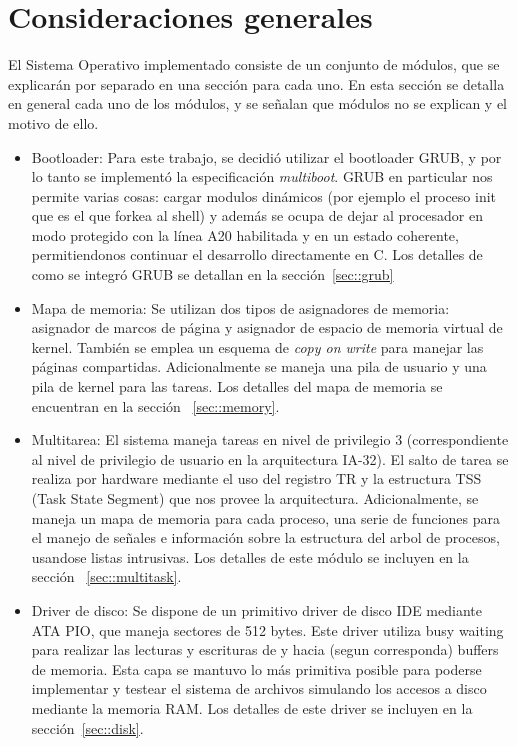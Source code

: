 \section{Consideraciones generales}

El Sistema Operativo implementado consiste de un conjunto de m\'odulos,
que se explicar\'an por separado en una secci\'on para cada uno.
En esta secci\'on se detalla en general cada uno de los m\'odulos, y se se\~nalan
que m\'odulos no se explican y el motivo de ello.

\begin{itemize}
	\item Bootloader: Para este trabajo, se decidi\'o utilizar el bootloader
	GRUB, y por lo tanto se implement\'o la especificaci\'on \textit{multiboot}.
	GRUB en particular nos permite varias cosas: cargar modulos din\'amicos (por
	ejemplo el proceso init que es el que forkea al shell) y adem\'as se ocupa de
	dejar al procesador en modo protegido con la l\'inea A20 habilitada y en un
	estado coherente, permitiendonos continuar el desarrollo directamente en C.
	Los detalles de como se integr\'o GRUB se detallan en la secci\'on~\ref{sec::grub}

	\item Mapa de memoria: Se utilizan dos tipos de asignadores de memoria:
	asignador de marcos de p\'agina y asignador de espacio de memoria virtual de
	kernel. Tambi\'en se emplea un esquema de \textit{copy on write} para manejar
	las p\'aginas compartidas. Adicionalmente se maneja una pila de usuario y una pila
	de kernel para las tareas. Los detalles del mapa de memoria se encuentran en la
	secci\'on ~\ref{sec::memory}.

	\item Multitarea: El sistema maneja tareas en nivel de privilegio 3 (correspondiente
	al nivel de privilegio de usuario en la arquitectura IA-32). El salto de tarea se realiza
	por hardware mediante el uso del registro TR y la estructura TSS (Task State Segment) que
	nos provee la arquitectura. Adicionalmente, se maneja un mapa de memoria para cada proceso,
	una serie de funciones para el manejo de señales e informaci\'on sobre la estructura del arbol
	de procesos, usandose listas intrusivas. Los detalles de este m\'odulo se incluyen en la secci\'on
	~\ref{sec::multitask}.

	\item Driver de disco: Se dispone de un primitivo driver de disco IDE mediante ATA PIO, que maneja
	sectores de 512 bytes. Este driver utiliza busy waiting para realizar las lecturas y escrituras de
	y hacia (segun corresponda) buffers de memoria. Esta capa se mantuvo lo m\'as primitiva posible para
	poderse implementar y testear el sistema de archivos simulando los accesos a disco mediante la memoria
	RAM. Los detalles de este driver se incluyen en la secci\'on~\ref{sec::disk}.


\end{itemize}

